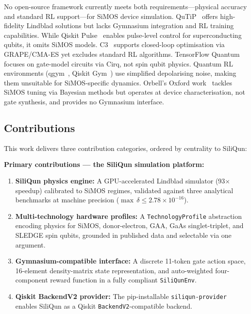 No open-source framework currently meets both requirements—physical accuracy and standard RL support—for SiMOS device simulation. QuTiP~\cite{Lambert2024} offers high-fidelity Lindblad solutions but lacks Gymnasium integration and RL training capabilities. While Qiskit Pulse~\cite{Alexander2020} enables pulse-level control for superconducting qubits, it omits SiMOS models. C3~\cite{Wittler2021} supports closed-loop optimisation via GRAPE/CMA-ES yet excludes standard RL algorithms. TensorFlow Quantum~\cite{Broughton2020} focuses on gate-model circuits via Cirq, not spin qubit physics. Quantum RL environments (qgym~\cite{VanDerLinde2023}, Qiskit Gym~\cite{QiskitGym2024}) use simplified depolarising noise, making them unsuitable for SiMOS-specific dynamics. Orbell's Oxford work~\cite{Orbell2024} tackles SiMOS tuning via Bayesian methods but operates at device characterisation, not gate synthesis, and provides no Gymnasium interface.  

\subsection{Contributions}
\label{subsec:contributions}

This work delivers three contribution categories, ordered by centrality to SiliQun:  

\textbf{Primary contributions --- the SiliQun simulation platform:}  
\begin{enumerate}
  \item \textbf{SiliQun physics engine:} A GPU-accelerated Lindblad simulator (93$\times$ speedup) calibrated to SiMOS regimes, validated against three analytical benchmarks at machine precision ($\max\,\delta \leq 2.78 \times 10^{-16}$).  
  \item \textbf{Multi-technology hardware profiles:} A \texttt{TechnologyProfile} abstraction encoding physics for SiMOS, donor-electron, GAA, GaAs singlet-triplet, and SLEDGE spin qubits, grounded in published data and selectable via one argument.  
  \item \textbf{Gymnasium-compatible interface:} A discrete 11-token gate action space, 16-element density-matrix state representation, and auto-weighted four-component reward function in a fully compliant \texttt{SiliQunEnv}.  
  \item \textbf{Qiskit BackendV2 provider:} The pip-installable \texttt{siliqun-provider} enables SiliQun as a Qiskit \texttt{BackendV2}-compatible backend.  
\end{enumerate}